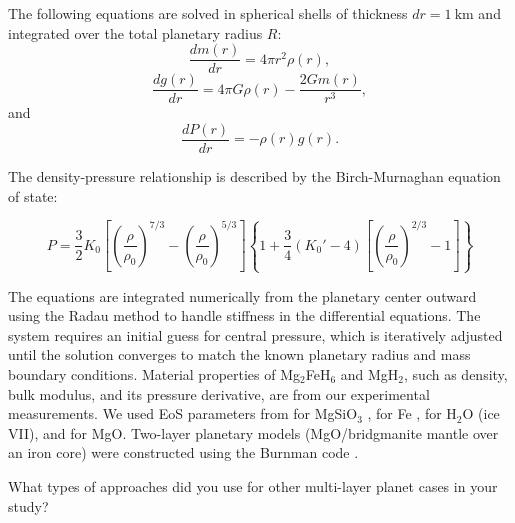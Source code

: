 \documentclass[draft,jgrga,12pt]{agujournal2019}
\begin{document}
The following equations are solved in spherical shells of thickness $dr = 1~\mathrm{km}$ and integrated over the total planetary radius $R$:
\begin{equation}
    \frac{dm(r)}{dr} = 4\pi r^2\rho (r),
\end{equation}
\begin{equation}
    \frac{dg(r)}{dr} = 4 \pi G\rho (r) -\frac{2Gm(r)}{r^3},
\end{equation}
and
\begin{equation}
    \frac{dP(r)}{dr} = -\rho (r) g (r).
\end{equation}
    
The density-pressure relationship is described by the  Birch-Murnaghan equation of state:

\begin{equation}
P = \frac{3}{2}K_0\left[\left(\frac{\rho}{\rho_0}\right)^{7/3} - \left(\frac{\rho}{\rho_0}\right)^{5/3}\right]\left\{1 + \frac{3}{4}(K_0' - 4)\left[\left(\frac{\rho}{\rho_0}\right)^{2/3} - 1\right]\right\}
\end{equation}

The equations are integrated numerically from the planetary center outward using the Radau method \cite{butcher_coefficients_1963} to handle stiffness in the differential equations. 
The system requires an initial guess for central pressure, which is iteratively adjusted until the solution converges to match the known planetary radius and mass boundary conditions. 
Material properties of Mg$_2$FeH$_6$ and MgH$_2$, such as density, bulk modulus, and its pressure derivative, are from our experimental measurements.
We used EoS parameters from  for MgSiO$_3$ ,  for Fe ,  for H$_2$O (ice VII), and  for MgO\@. 
Two-layer planetary models (MgO/bridgmanite mantle over an iron core) were constructed using the Burnman code \cite{myhill_burnman_2023}.
\begin{cbox}
What types of approaches did you use for other multi-layer planet cases in your study?
\end{cbox}


\section{}
\end{document}
